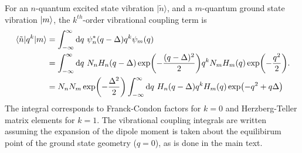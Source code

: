 \documentclass[aip, jcp, reprint, onecolumn, nofootinbib]{revtex4-2}
\begin{document}
For an $n$-quantum excited state vibration $| \tilde{n} \rangle$, and a $m$-quantum ground state vibration $\ket{m}$, the $k^{th}$-order vibrational coupling term is
\begin{equation}
	\begin{split}
		\mel{\tilde{n}}{q^k}{m} &= \int_{-\infty}^\infty \mathrm{d}q \ \psi^*_n(q-\Delta) q^k \psi_m(q)\\
		&= \int_{-\infty}^\infty \mathrm{d}q \ N_n H_n(q-\Delta) \exp(-\frac{(q - \Delta)^2}{2}) q^k N_m H_m(q) \exp(-\frac{q^2}{2}). \\
		&= N_n N_m \exp(-\frac{\Delta^2}{2}) \int_{-\infty}^\infty \mathrm{d}q \ H_n(q-\Delta) q^k H_m(q) \exp(-q^2 + q\Delta)
	\end{split}\label{key}
\end{equation}
The integral corresponds to Franck-Condon factors for $k=0$ and Herzberg-Teller matrix elements for $k=1$.
The vibrational coupling integrals are written assuming the expansion of the dipole moment is taken about the equilibirum point of the ground state geometry ($q=0$), as is done in the main text.
\end{document}
